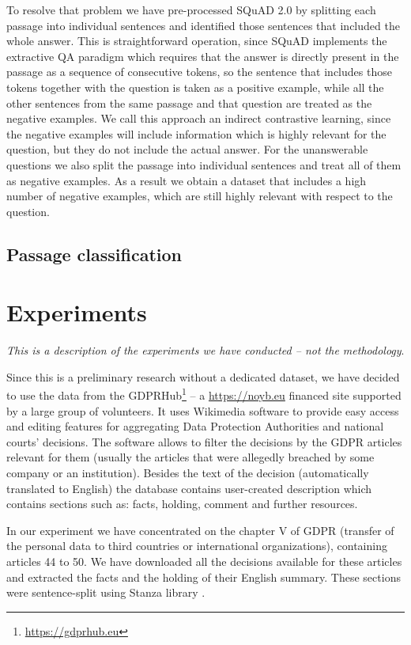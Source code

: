 \documentclass{IOS-Book-Article}
\begin{document}
To resolve that problem we have pre-processed SQuAD 2.0 by splitting each passage into individual sentences and identified
those sentences that included the whole answer. This is straightforward operation, since SQuAD implements the extractive
QA paradigm which requires that the answer is directly present in the passage as a sequence of consecutive tokens,
so the sentence that includes those tokens together with the question is taken as a positive example, while
all the other sentences from the same passage and that question are treated as the negative examples.
We call this approach an indirect contrastive learning, since the negative examples will include information 
which is highly relevant for the question, but they do not include the actual answer. For the unanswerable questions
we also split the passage into individual sentences and treat all of them as negative examples. As a result we 
obtain a dataset that includes a high number of negative examples, which are still highly relevant with respect to the 
question.

\subsection{Passage classification}

\section{Experiments}
\label{sec:experiments}

\textit{This is a description of the experiments we have conducted -- not the methodology}.

Since this is a preliminary research without a dedicated dataset, we have decided to use
the data from the GDPRHub\footnote{\url{https://gdprhub.eu}} -- a \url{https://noyb.eu} financed site supported by
a large group of volunteers. It uses Wikimedia software to provide easy access and editing features for 
aggregating Data Protection Authorities and national courts' decisions. The software  allows to filter the 
decisions by the GDPR articles relevant for them (usually the articles that were allegedly breached by some 
company or an institution). Besides the text of the decision (automatically translated to English) the database
contains user-created description which contains sections such as: facts, holding, comment and further resources.

In our experiment we have concentrated on the chapter V of GDPR (transfer of the personal data to third countries or 
international organizations), containing articles 44 to 50. We have downloaded all the decisions available for 
these articles and extracted the facts and the holding of their English summary. These sections were sentence-split
using Stanza library \cite{qi2020stanza}.
\end{document}
